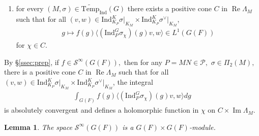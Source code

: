 \documentclass[10pt]{amsart}
\newtheorem{lemma}[theorem]{Lemma}
\theoremstyle{definition}
\numberwithin{equation}{section}
\numberwithin{equation}{subsection}
\newcommand{\Ind}{\mathrm{Ind}}
\renewcommand{\Im}{\mathop{\mathrm{Im}}}
\renewcommand{\Re}{\mathop{\mathrm{Re}}}
\begin{document}
\begin{enumerate}[label=(S\text{\arabic*}), ref=S\text{\arabic*}]
    \item\label{S1} for every $(M,\sigma)\in\widetilde{\mathrm{Temp}}_\Ind(G)$ there exists a positive cone $C$ in $\Re\Lambda_M$  such that for all $(v,w)\in\Ind_{K_P }^K\sigma\vert_{K_M }\times \Ind_{K_P }^K\sigma^\vee\vert_{K_M }$, 
    \begin{align*}
        g\mapsto f(g)\langle(\Ind_P^G\sigma_\chi)(g)v,w\rangle \in L^1(G(F))
    \end{align*}
    for $\chi\in C$. 
\end{enumerate}
By \S \ref{ssec:prep}, if $f\in \mathcal{S}^\infty(G(F)),$ then for any $P=MN\in \mathcal{P},$  $\sigma\in \Pi_2(M),$ there is a positive cone $C$ in $\Re \Lambda_M$ such that for all $(v,w)\in\Ind_{K_P }^K\sigma\vert_{K_M }\times \Ind_{K_P }^K\sigma^\vee\vert_{K_M }$, the integral
\begin{align*}
    \int_{G(F)} f(g)\langle(\Ind_P^G\sigma_\chi)(g)v,w\rangle dg
\end{align*}
is absolutely convergent and defines a holomorphic function in $\chi$ on $C\times \Im \Lambda_M$.


\begin{lemma}\label{Sinftymodule}
    The space $\mathcal{S}^\infty(G(F))$ is a $G(F)\times G(F)$-module.  
\end{lemma}
\end{document}
